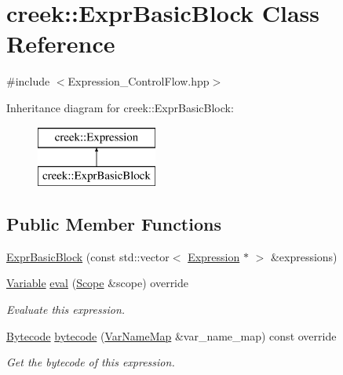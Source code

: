 \hypertarget{classcreek_1_1_expr_basic_block}{}\section{creek\+:\+:Expr\+Basic\+Block Class Reference}
\label{classcreek_1_1_expr_basic_block}


{\ttfamily \#include $<$Expression\+\_\+\+Control\+Flow.\+hpp$>$}

Inheritance diagram for creek\+:\+:Expr\+Basic\+Block\+:\begin{figure}[H]
\begin{center}
\leavevmode
\includegraphics[height=2.000000cm]{classcreek_1_1_expr_basic_block}
\end{center}
\end{figure}
\subsection*{Public Member Functions}
\begin{DoxyCompactItemize}
\item 
\hyperlink{classcreek_1_1_expr_basic_block_a216cf798b100831bbecf17b9d9bdf779}{Expr\+Basic\+Block} (const std\+::vector$<$ \hyperlink{classcreek_1_1_expression}{Expression} $\ast$ $>$ \&expressions)
\item 
\hyperlink{classcreek_1_1_variable}{Variable} \hyperlink{classcreek_1_1_expr_basic_block_a95fe118d4b862d16640f002449cd4278}{eval} (\hyperlink{classcreek_1_1_scope}{Scope} \&scope) override
\begin{DoxyCompactList}\small\item\em Evaluate this expression. \end{DoxyCompactList}\item 
\hyperlink{classcreek_1_1_bytecode}{Bytecode} \hyperlink{classcreek_1_1_expr_basic_block_aa8b986919f6ce358d9fccf91ff1cc98a}{bytecode} (\hyperlink{classcreek_1_1_var_name_map}{Var\+Name\+Map} \&var\+\_\+name\+\_\+map) const  override\hypertarget{classcreek_1_1_expr_basic_block_aa8b986919f6ce358d9fccf91ff1cc98a}{}\label{classcreek_1_1_expr_basic_block_aa8b986919f6ce358d9fccf91ff1cc98a}

\begin{DoxyCompactList}\small\item\em Get the bytecode of this expression. \end{DoxyCompactList}\end{DoxyCompactItemize}



